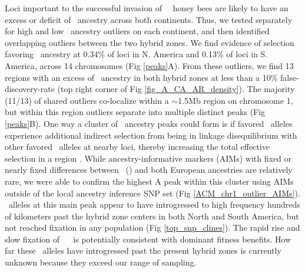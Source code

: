 Loci important to the successful invasion of \africanized\ \hyb\ honey bees are likely to have an excess or deficit of \scutellata\ ancestry across both continents. Thus, we tested separately for high and low \A\ ancestry outliers on each continent, and then identified overlapping outliers between the two hybrid zones. We find evidence of selection favoring \scutellata\ ancestry at 0.34\% of loci in N. America and 0.13\% of loci in S. America, across 14 chromosomes (Fig \ref{peaks}A). From these outliers, we find 13 regions with an excess of \A\ ancestry in both hybrid zones at less than a 10\% false-discovery-rate (top right corner of Fig \ref{fig_A_CA_AR_density}). The majority (11/13) of shared outliers co-localize within a $\sim$1.5Mb region on chromosome 1, but within this region outliers separate into multiple distinct peaks (Fig \ref{peaks}B). One way a cluster of \A\ ancestry peaks could form is if favored \scutellata\ alleles experience additional indirect selection from being in linkage disequilibrium with other favored \scutellata\ alleles at nearby loci, thereby increasing the total effective selection in a region \cite{Barton:1983fx}. While ancestry-informative markers (AIMs) with fixed or nearly fixed differences between \scutellata\ \ahb(\A) and both European  ancestries are relatively rare, we were able to confirm the highest A peak within this cluster using AIMs outside of the local ancestry inference SNP set (Fig \ref{ACM_chr1_outlier_AIMs}). \A\ alleles at this main peak appear to have introgressed to high frequency hundreds of kilometers past the hybrid zone centers in both North and South America, but not reached fixation in any population (Fig \ref{top_snp_clines}). The rapid rise and slow fixation of \A\ \anc\  is potentially consistent with dominant fitness benefits. How far these \A\ alleles have introgressed past the present hybrid zones is currently unknown because they exceed our range of sampling.

